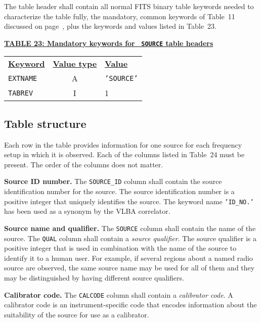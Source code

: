 \documentclass[twoside]{article}
\newcommand{\Hi}[1]{\textcolor{hicol}{#1}}
\begin{document}
\Hi{The table header shall contain all normal FITS binary table
keywords needed to characterize the table fully, the mandatory, common
keywords of Table~11 discussed on page~\pageref{ta:keywords}, plus the
keywords and values listed in Table~\Hi{23}.}

\begin{center}
\underline{\bf{TABLE \Hi{23}: Mandatory keywords for {\tt
    SOURCE} table headers}}\\
\begin{tabular}{lcl}
\noalign{\vspace{2pt}}
\underline{{\bf Keyword}} & \underline{\bf{Value type}} &
    \underline{\bf{Value\vphantom{y}}} \\
\noalign{\vspace{2pt}}
{\tt EXTNAME}   & A & {\tt 'SOURCE'}  \\
{\tt TABREV}    & I & 1 \\
\end{tabular}
\end{center}

\subsection{Table structure}

Each row in the table provides information for one source for each
frequency setup in which it is observed.  Each of the columns listed
in Table~\Hi{24} must be present.  The order of the columns does not
matter.

{\bf Source ID number.}  The {\tt SOURCE\_ID} column shall contain the
source identification number for the source.  The source
identification number is a positive integer that uniquely identifies
the source.  \Hi{The keyword name {\tt 'ID\_NO.'} has been used as a
synonym by the VLBA correlator.}

{\bf Source name and qualifier.} The {\tt SOURCE} column shall contain
the name of the source.  The {\tt QUAL} column shall contain a {\it
  source qualifier}.  The source qualifier is a \Hi{positive} integer
that is used in combination with the name of the source to identify it
to a human user.  For example, if several regions about a named radio
source are observed, the same source name may be used for all of them
and they may be distinguished by having different source qualifiers.

{\bf Calibrator code.}  The {\tt CALCODE} column shall contain a {\it
  calibrator code}.  A calibrator code is an instrument-specific code
that encodes information about the suitability of the source for use
as a calibrator.
\end{document}
